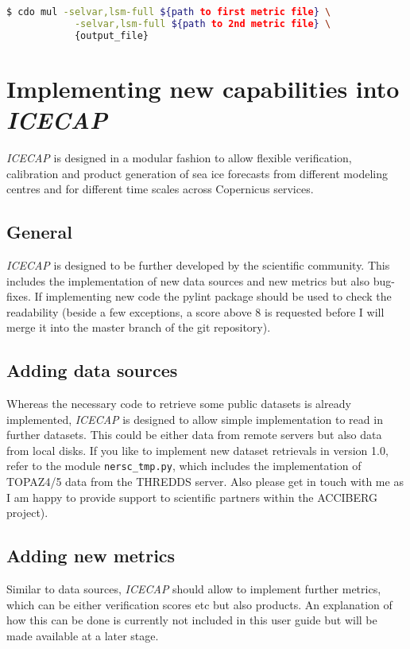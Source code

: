 \documentclass[DIV=10, parskip=full]{scrreprt}
\newcommand{\ice}{\textit{ICECAP}\xspace}
\newcommand{\version}{1.0\xspace}
\newcommand{\notimplement}[1]{#1}
\begin{document}
\begin{lstlisting}[language=bash]
	$ cdo mul -selvar,lsm-full ${path to first metric file} \
			-selvar,lsm-full ${path to 2nd metric file} \
			{output_file}
\end{lstlisting}


\chapter{Implementing new capabilities into  \ice}\label{chap:develop}
\ice is designed in a modular fashion to allow flexible verification, calibration and product generation of sea ice forecasts from different modeling centres and for different time scales across Copernicus services. 

\section{General}
\ice is designed to be further developed by the scientific community. This includes the implementation of new data sources and new metrics but also bug-fixes. If implementing new code the pylint package should be used to check the readability (beside a few exceptions, a score above 8 is requested before I will merge it into the master branch of the git repository).

\section{Adding data sources}
Whereas the necessary code to retrieve some public datasets is already implemented, \ice is designed to allow simple implementation to read in further datasets. This could be either data from remote servers but also data from local disks. \notimplement{If you like to implement new dataset retrievals in version \version, refer to the module \texttt{nersc\_tmp.py}, which includes the implementation of TOPAZ4/5 data from the THREDDS server. Also please get in touch with me as I am happy to provide support to scientific partners within the ACCIBERG project).}

\section{Adding new metrics}
Similar to data sources, \ice should allow to implement further metrics, which can be either verification scores etc but also products. An explanation of how this can be done is currently \notimplement{not included in this user guide but will be made available at a later stage}. \\
\end{document}
